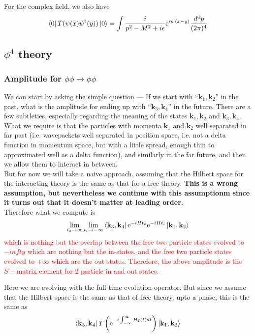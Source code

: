 \documentclass[11pt]{article}
\newcommand{\e}{\mathrm{e}}
\numberwithin{equation}{section}
\begin{document}
    For the complex field, we also have 
    \begin{equation*}
        \bra{0} T ( \psi(x) \psi^\dagger(y) )\ket{0} = \int \frac{i}{p^2 - M^2 + i\epsilon} \e^{ip\cdot(x-y)} \frac{d^4p}{(2\pi)^4}
    \end{equation*}

    \subsection{\(\phi^4\) theory}
    \subsubsection{Amplitude for \(\phi\phi \to \phi\phi\)}
    We can start by asking the simple question — If we start with ``\(\textbf{k}_1,\textbf{k}_2\)'' in the past, what is the amplitude for ending up with ``\(\textbf{k}_3, \textbf{k}_4\)'' in the future. There are a few subtleties, especially regarding the meaning of the states \(\textbf{k}_1,\textbf{k}_2\) and \(\textbf{k}_3, \textbf{k}_4\). What we require is that the particles with momenta \(\textbf{k}_1\) and \(\textbf{k}_2\) well separated in far past (i.e. wavepackets well separated in position space, i.e. not a delta function in momentum space, but with a little spread, enough thin to approximated well as a delta function), and similarly in the far future, and then we allow them to interact in between. \\
    But for now we will take a naive approach, assuming that the Hilbert space for the interacting theory is the same as that for a free theory. \textbf{This is a wrong assumption, but nevertheless we continue with this assumptionm since it turns out that it doesn't matter at leading order.}\\ 
    Therefore what we compute is 
    \begin{equation*}
        \lim_{t_o\to \infty}\lim_{t_i\to -\infty}\bra{\textbf{k}_3, \textbf{k}_4} \e^{-iHt_o}\e^{-iHt_i} \ket{\textbf{k}_1, \textbf{k}_2}
    \end{equation*}
    \textcolor{red}{
        which is nothing but the overlap between the free two-particle states evolved to \(-infty\) which are nothing but the in-states, and the free two particle states evolved to \(+\infty\) which are the out-states. Therefore, the above amplitude is the \(S-\)matrix element for 2 particle in and out states.\\
    }

    Here we are evolving with the full time evolution operator. But since we assume that the Hilbert space is the same as that of free theory, upto a phase, this is the same as 
    \begin{equation*}
        \bra{\textbf{k}_3, \textbf{k}_4} T\left(\e^{-i\int_{-\infty}^{\infty}H_I(t) dt }\right) \ket{\textbf{k}_1, \textbf{k}_2}
    \end{equation*}
\end{document}
